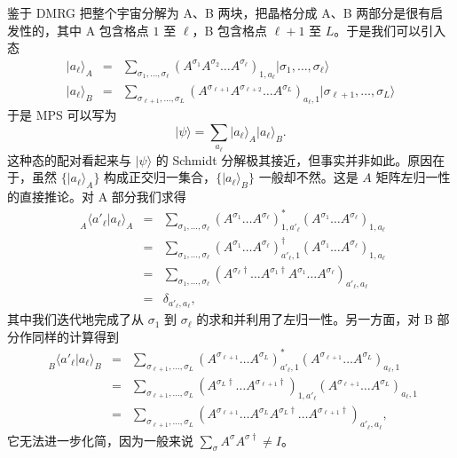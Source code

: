\documentclass[a4paper,10pt,oneside,onecolumn,1p,times]{elsarticle}
\newcommand{\ket}[1]{\mbox{$| #1  \rangle$}}
\newcommand{\braket}[2]{\mbox{$\langle #1  | #2 \rangle$}} 	%
\begin{document}
鉴于 DMRG 把整个宇宙分解为 A、B 两块，把晶格分成 A、B 两部分是很有启发性的，其中 A 包含格点 $1$ 至 $\ell$，B 包含格点 $\ell+1$ 至 $L$。于是我们可以引入态
\begin{eqnarray}
\ket{a_\ell}_A &=& \sum_{\sigma_1,\ldots,\sigma_\ell} (A^{\sigma_1} A^{\sigma_2} \ldots A^{\sigma_\ell})_{1,a_\ell} \ket{\sigma_1,\ldots,\sigma_\ell} \\
\ket{a_\ell}_B &=& \sum_{\sigma_{\ell+1},\ldots,\sigma_L} (A^{\sigma_{\ell+1}} A^{\sigma_{\ell+2}} \ldots A^{\sigma_L})_{a_\ell,1} \ket{\sigma_{\ell+1},\ldots,\sigma_L}
\end{eqnarray}
于是 MPS 可以写为
\begin{equation}
\ket{\psi} = \sum_{a_\ell} \ket{a_\ell}_A \ket{a_\ell}_B . 
\end{equation}
这种态的配对看起来与 $\ket{\psi}$ 的 Schmidt 分解极其接近，但事实并非如此。原因在于，虽然 $\{ \ket{a_\ell}_A \}$ 构成正交归一集合，$\{ \ket{a_\ell}_B \}$ 一般却不然。这是 $A$ 矩阵左归一性的直接推论。对 A 部分我们求得 
\begin{eqnarray*}
\phantom\langle_A \braket{a'_\ell}{a_\ell}_A &=& \sum_{\sigma_1,\ldots,\sigma_\ell} (A^{\sigma_1} \ldots A^{\sigma_\ell})^*_{1,a'_\ell} (A^{\sigma_1} \ldots A^{\sigma_\ell})_{1,a_\ell} \\
&=& \sum_{\sigma_1,\ldots,\sigma_\ell} (A^{\sigma_1} \ldots A^{\sigma_\ell})^\dagger_{a'_\ell,1} (A^{\sigma_1} \ldots A^{\sigma_\ell})_{1,a_\ell} \\
&=& \sum_{\sigma_1,\ldots,\sigma_\ell} (A^{\sigma_\ell\dagger} \ldots A^{\sigma_1\dagger}A^{\sigma_1} \ldots A^{\sigma_\ell})_{a'_\ell,a_\ell} \\
&=& \delta_{a'_\ell,a_\ell} ,
\end{eqnarray*}
其中我们迭代地完成了从 $\sigma_1$ 到 $\sigma_\ell$ 的求和并利用了左归一性。另一方面，对 B 部分作同样的计算得到
\begin{eqnarray*}
\phantom\langle_B \braket{a'_\ell}{a_\ell}_B &=& \sum_{\sigma_{\ell+1},\ldots,\sigma_L} (A^{\sigma_{\ell+1}} \ldots A^{\sigma_L})^*_{a'_\ell,1} (A^{\sigma_{\ell+1}} \ldots A^{\sigma_L})_{a_\ell,1} \\
&=& \sum_{\sigma_{\ell+1},\ldots,\sigma_L} (A^{\sigma_L\dagger} \ldots A^{\sigma_{\ell+1}\dagger})_{1,a'_\ell} (A^{\sigma_{\ell+1}} \ldots A^{\sigma_L})_{a_\ell,1} \\
&=& \sum_{\sigma_{\ell+1},\ldots,\sigma_L} (A^{\sigma_{\ell+1}} \ldots A^{\sigma_L}A^{\sigma_L\dagger} \ldots A^{\sigma_{\ell+1}\dagger})_{a'_\ell,a_\ell},
\end{eqnarray*}
它无法进一步化简，因为一般来说 $\sum_\sigma A^\sigma A^{\sigma\dagger} \neq I$。
\end{document}
